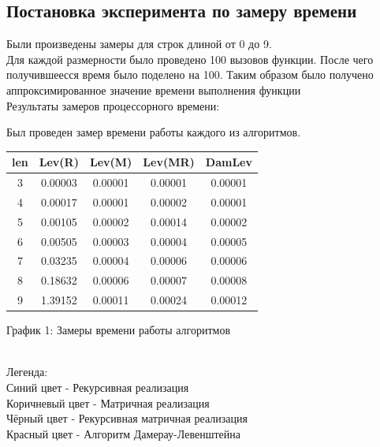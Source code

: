 \documentclass[12pt,a4paper]{article}
\begin{document}
\subsection{Постановка эксперимента по замеру времени}
Были произведены замеры для строк длиной от 0 до 9.\\
Для каждой размерности было проведено 100 вызовов функции. После чего получившеесся время было поделено на 100. Таким образом было получено аппроксимированное значение времени выполнения функции\\
Результаты замеров процессорного времени:\\
\begin{center}
	Был проведен замер времени работы каждого из алгоритмов.

\begin{center}
	\begin{tabular}{|c c c c c|} 
 	\hline
	len & Lev(R) & Lev(M) & Lev(MR) & DamLev \\ [0.5ex] 
 	\hline\hline
 	3 & 0.00003 & 0.00001 & 0.00001 & 0.00001\\
 	\hline
 	4 &  0.00017  &  0.00001 &  0.00002 & 0.00001\\
 	\hline
	5 & 0.00105 & 0.00002 & 0.00014 & 0.00002\\
	\hline
	6 &  0.00505 & 0.00003 & 0.00004 & 0.00005\\
	\hline
	7 & 0.03235 & 0.00004 & 0.00006 & 0.00006\\
	\hline
	8 & 0.18632 & 0.00006 & 0.00007 & 0.00008\\
	\hline
	9 & 1.39152 & 0.00011 & 0.00024 & 0.00012\\
	\hline
	\end{tabular}
\end{center}

\begin{center}
График 1: Замеры времени работы алгоритмов
	\\
	Легенда:\\
	Синий цвет - Рекурсивная реализация\\
	Коричневый цвет - Матричная реализация\\
	Чёрный цвет - Рекурсивная матричная реализация\\
	Красный цвет - Алгоритм Дамерау-Левенштейна\\
	

\end{center}
\end{center}
\end{document}
